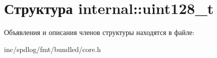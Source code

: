 \hypertarget{structinternal_1_1uint128__t}{}\section{Структура internal\+:\+:uint128\+\_\+t}
\label{structinternal_1_1uint128__t}


Объявления и описания членов структуры находятся в файле\+:\begin{DoxyCompactItemize}
\item 
inc/spdlog/fmt/bundled/core.\+h\end{DoxyCompactItemize}
